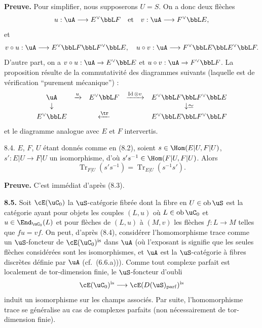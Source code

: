 \noindent\textbf{Preuve.} Pour simplifier, nous supposerons $U = S$. On a donc deux fl\`{e}ches
\[
u : \uA \longrightarrow E^{\vee} \bbL F \quad \text{et} \quad v : \uA \longrightarrow F^{\vee} \bbL E ,
\]
et
\[
v \circ u : \uA \longrightarrow E^{\vee} \bbL F \bbL F^{\vee} \bbL E , \quad u \circ v : \uA \longrightarrow F^{\vee} \bbL E \bbL E^{\vee} \bbL F .
\]
D'autre part, on a $v \circ u : \uA \rightarrow E^{\vee} \bbL E$ et $u \circ v : \uA \rightarrow F^{\vee} \bbL F$. La proposition r\'{e}sulte de la commutativit\'{e} des diagrammes suivants (laquelle est de v\'{e}rification ``purement m\'{e}canique'') :
\[
\begin{array}{ccccc}
\uA & \xrightarrow{u} & E^{\vee} \bbL F & \xrightarrow{\operatorname{Id} \otimes v} & E^{\vee} \bbL F \bbL F^{\vee} \bbL E \\
\downarrow & & & & \downarrow \simeq \\
E^{\vee} \bbL E & & \xleftarrow{\tr} & & E^{\vee} \bbL E \bbL F^{\vee} \bbL F
\end{array}
\]
et le diagramme analogue avec $E$ et $F$ intervertis.

\begin{proposition} 8.4.
$E$, $F$, $U$ \'{e}tant donn\'{e}s comme en (8.2), soient $s \in \Hom(E|U, F|U)$, $s' : E|U \rightarrow F|U$ un isomorphisme, d'o\`{u} $s's^{-1} \in \Hom(F|U, F|U)$. Alors
\[
\operatorname{Tr}_{F|U}(s's^{-1}) = \operatorname{Tr}_{E|U}(s^{-1}s') .
\]
\end{proposition}

\noindent\textbf{Preuve.} C'est imm\'{e}diat d'apr\`{e}s (8.3).

\bigskip
\noindent\textbf{8.5.} Soit $\cE(\uC_0)$ la $\uS$-cat\'{e}gorie fibr\'{e}e dont la fibre en $U \in \operatorname{ob} \uS$ est la cat\'{e}gorie ayant pour objets les couples $(L,u)$ o\`{u} $L \in \operatorname{ob} \uC_0$ et $u \in \End_{\uC_0}(L)$ et pour fl\`{e}ches de $(L,u)$ \`{a} $(M,v)$ les fl\`{e}ches $f : L \rightarrow M$ telles que $fu = vf$. On peut, d'apr\`{e}s (8.4), consid\'{e}rer l'homomorphisme trace comme un $\uS$-foncteur de $\cE(\uC_0)^{\mathrm{is}}$ dans $\uA$ (o\`{u} l'exposant $\mathrm{is}$ signifie que les seules fl\`{e}ches consid\'{e}r\'{e}es sont les isomorphismes, et $\uA$ est la $\uS$-cat\'{e}gorie \`{a} fibres discr\`{e}tes d\'{e}finie par $\uA$ (cf.~(6.6.a))). Comme tout complexe parfait est localement de tor-dimension finie, le $\uS$-foncteur d'oubli
\[
\cE(\uC_0)^{\mathrm{is}} \longrightarrow \cE(D(\uS)_{\mathrm{parf}})^{\mathrm{is}}
\]
induit un isomorphisme sur les champs associ\'{e}s. Par suite, l'homomorphisme trace se g\'{e}n\'{e}ralise au cas de complexes parfaits (non n\'{e}cessairement de tor-dimension finie).


